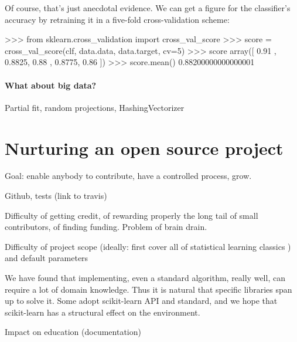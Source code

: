 \documentclass[a4paper]{article}
\begin{document}
Of course, that's just anecdotal evidence. We can get a figure for the
classifier's accuracy by retraining it in a five-fold cross-validation scheme:

\begin{pythoncode}
>>> from sklearn.cross\_validation import cross\_val\_score
>>> score = cross\_val\_score(clf, data.data, data.target, cv=5)
>>> score
array([ 0.91  ,  0.8825,  0.88  ,  0.8775,  0.86  ])
>>> score.mean()
0.88200000000000001
\end{pythoncode}

\paragraph{What about big data?}
%
Partial fit, random projections, HashingVectorizer

\section{Nurturing an open source project}

Goal: enable anybody to contribute, have a controlled process, grow.

Github, tests (link to travis)

Difficulty of getting credit, of rewarding properly the long tail of small
contributors, of finding funding. Problem of brain drain.

Difficulty of project scope (ideally: first cover all of statistical
learning classics \cite{elemstatlearn}) and default parameters

We have found that implementing, even a standard algorithm, really well,
can require a lot of domain knowledge. Thus it is natural that specific
libraries span up to solve it. Some adopt scikit-learn API and standard,
and we hope that scikit-learn has a structural effect on the environment.

Impact on education (documentation)

\small


\end{document}

